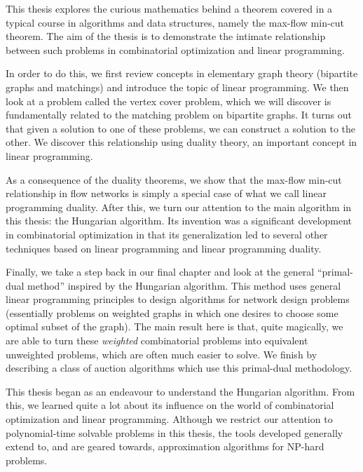 This thesis explores the curious mathematics behind a theorem covered in a typical course in 
algorithms and data structures, namely the max-flow min-cut theorem. The aim of the thesis is to 
demonstrate the intimate relationship between such problems in combinatorial optimization and linear 
programming.

In order to do this, we first 
review concepts in elementary graph theory (bipartite graphs and matchings) and introduce the topic 
of linear programming. We then look at a problem called the vertex cover problem, which we will discover 
is fundamentally related to the matching problem on bipartite graphs. It turns out that given a solution 
to one of these problems, we can construct a solution to the other. We discover this relationship 
using duality theory, an important concept in linear programming. 

As a consequence of the duality 
theorems, we show that the max-flow min-cut relationship in flow networks is simply a special case of 
what we call linear programming duality. 
After this, we turn our attention to the main algorithm in this thesis:
the Hungarian algorithm. Its invention was a significant development in combinatorial optimization 
in that its generalization led to several other techniques based on linear programming and linear 
programming duality. 

Finally, we take a step back in our final chapter and look at the general 
``primal-dual method'' inspired by the Hungarian algorithm. This method uses general linear programming 
principles to design algorithms for network design problems (essentially problems on weighted graphs in 
which one desires to choose some optimal subset of the graph). The main result here is that, quite 
magically, we are able to turn these \emph{weighted} combinatorial problems into equivalent unweighted 
problems, which 
are often much easier to solve. We finish by describing a class of auction algorithms which use this 
primal-dual methodology.

This thesis began as an endeavour to understand the Hungarian algorithm. From this, we learned 
quite a lot about its influence on the world of combinatorial optimization and linear programming. 
Although we restrict our attention to polynomial-time solvable problems in this thesis, the tools 
developed generally extend to, and are geared towards, approximation algorithms for NP-hard 
problems. 
